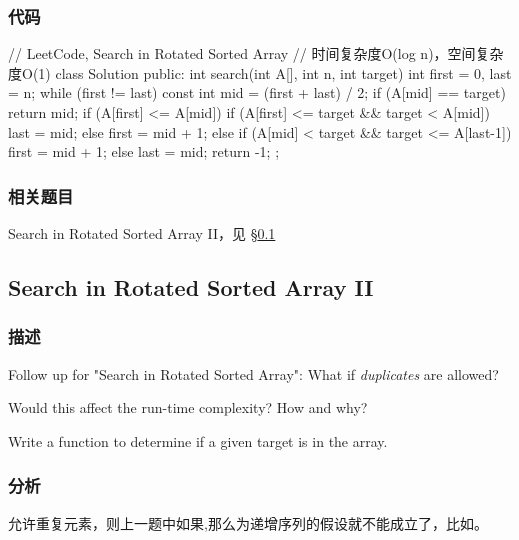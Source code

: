 \subsubsection{代码}
\begin{Code}
// LeetCode, Search in Rotated Sorted Array
// 时间复杂度O(log n)，空间复杂度O(1)
class Solution {
public:
    int search(int A[], int n, int target) {
        int first = 0, last = n;
        while (first != last) {
            const int mid = (first + last) / 2;
            if (A[mid] == target)
                return mid;
            if (A[first] <= A[mid]) {
                if (A[first] <= target && target < A[mid])
                    last = mid;
                else
                    first = mid + 1;
            } else {
                if (A[mid] < target && target <= A[last-1])
                    first = mid + 1;
                else
                    last = mid;
            }
        }
        return -1;
    }
};
\end{Code}


\subsubsection{相关题目}

\begindot
\item Search in Rotated Sorted Array II，见 \S \ref{sec:search-in-rotated-sorted-array-ii}
\myenddot


\subsection{Search in Rotated Sorted Array II}
\label{sec:search-in-rotated-sorted-array-ii}


\subsubsection{描述}
Follow up for "Search in Rotated Sorted Array": What if \emph{duplicates} are allowed?

Would this affect the run-time complexity? How and why?

Write a function to determine if a given target is in the array.


\subsubsection{分析}
允许重复元素，则上一题中如果,那么\fn{[l,m]}为递增序列的假设就不能成立了，比如\code{[1,3,1,1,1]}。

